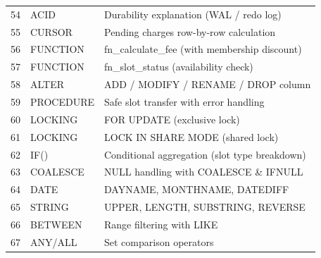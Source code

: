 \documentclass[12pt,a4paper]{article}
\begin{document}
\begin{longtable}{@{}clp{8cm}@{}}
54 & ACID      & Durability explanation (WAL / redo log) \\
55 & CURSOR    & Pending charges row-by-row calculation \\
56 & FUNCTION  & fn\_calculate\_fee (with membership discount) \\
57 & FUNCTION  & fn\_slot\_status (availability check) \\
58 & ALTER     & ADD / MODIFY / RENAME / DROP column \\
59 & PROCEDURE & Safe slot transfer with error handling \\
60 & LOCKING   & FOR UPDATE (exclusive lock) \\
61 & LOCKING   & LOCK IN SHARE MODE (shared lock) \\
62 & IF()      & Conditional aggregation (slot type breakdown) \\
63 & COALESCE  & NULL handling with COALESCE \& IFNULL \\
64 & DATE      & DAYNAME, MONTHNAME, DATEDIFF \\
65 & STRING    & UPPER, LENGTH, SUBSTRING, REVERSE \\
66 & BETWEEN   & Range filtering with LIKE \\
67 & ANY/ALL   & Set comparison operators \\
\bottomrule
\end{longtable}
\end{document}
